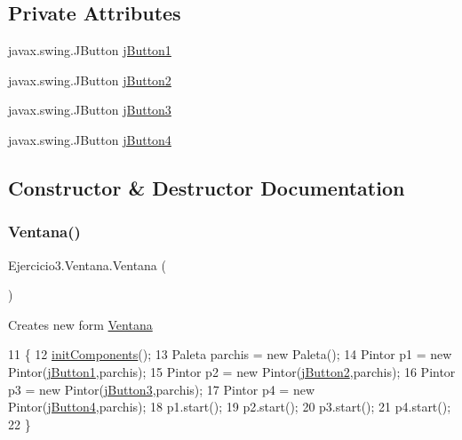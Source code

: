 \subsection*{Private Attributes}
\begin{DoxyCompactItemize}
\item 
javax.\+swing.\+J\+Button \mbox{\hyperlink{class_ejercicio3_1_1_ventana_a78dd8dc5e6b6a1d1558465cafa164556}{j\+Button1}}
\item 
javax.\+swing.\+J\+Button \mbox{\hyperlink{class_ejercicio3_1_1_ventana_a79e68bd221077efe89ad7a79052bc1a7}{j\+Button2}}
\item 
javax.\+swing.\+J\+Button \mbox{\hyperlink{class_ejercicio3_1_1_ventana_ac44e593863c65fac1c8ce056ce552be6}{j\+Button3}}
\item 
javax.\+swing.\+J\+Button \mbox{\hyperlink{class_ejercicio3_1_1_ventana_aa96e8c70f82bc835f2218641fd1b0649}{j\+Button4}}
\end{DoxyCompactItemize}


\subsection{Constructor \& Destructor Documentation}
\mbox{\label{class_ejercicio3_1_1_ventana_a58b0e4567e87b274acb3c7561643d17e}} 
\subsubsection{\texorpdfstring{Ventana()}{Ventana()}}
{\footnotesize\ttfamily Ejercicio3.\+Ventana.\+Ventana (\begin{DoxyParamCaption}{ }\end{DoxyParamCaption})\hspace{0.3cm}{\ttfamily [inline]}}

Creates new form \mbox{\hyperlink{class_ejercicio3_1_1_ventana}{Ventana}} 
\begin{DoxyCode}
11     \{
12         \mbox{\hyperlink{class_ejercicio3_1_1_ventana_ad598831bd9aca9eafe8dd6c558084a1d}{initComponents}}();
13         Paleta parchis = \textcolor{keyword}{new} Paleta();
14         Pintor p1 = \textcolor{keyword}{new} Pintor(\mbox{\hyperlink{class_ejercicio3_1_1_ventana_a78dd8dc5e6b6a1d1558465cafa164556}{jButton1}},parchis);
15         Pintor p2 = \textcolor{keyword}{new} Pintor(\mbox{\hyperlink{class_ejercicio3_1_1_ventana_a79e68bd221077efe89ad7a79052bc1a7}{jButton2}},parchis);
16         Pintor p3 = \textcolor{keyword}{new} Pintor(\mbox{\hyperlink{class_ejercicio3_1_1_ventana_ac44e593863c65fac1c8ce056ce552be6}{jButton3}},parchis);
17         Pintor p4 = \textcolor{keyword}{new} Pintor(\mbox{\hyperlink{class_ejercicio3_1_1_ventana_aa96e8c70f82bc835f2218641fd1b0649}{jButton4}},parchis);
18         p1.start();
19         p2.start();
20         p3.start();
21         p4.start();
22     \}
\end{DoxyCode}


